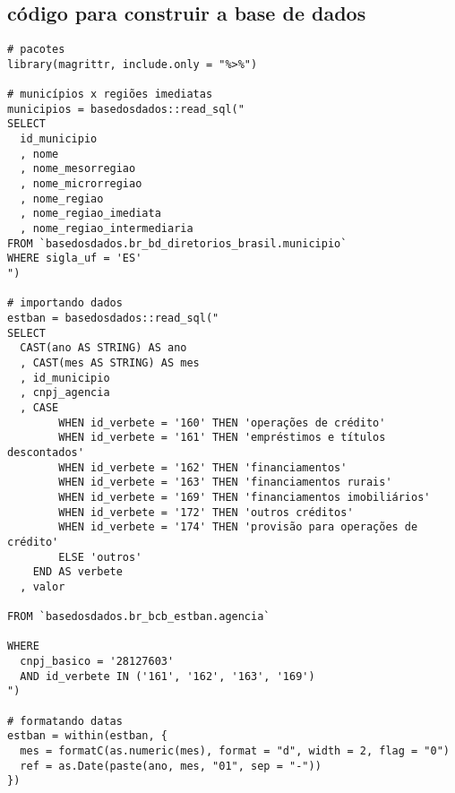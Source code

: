 \postextual

%
%
%
%
%

\begin{anexosenv}
\partanexos

\chapter{código para construir a base de dados}\label{anexo_a}

\begin{lstlisting}[frame=single]
# pacotes
library(magrittr, include.only = "%>%")

# municípios x regiões imediatas
municipios = basedosdados::read_sql("
SELECT
  id_municipio
  , nome
  , nome_mesorregiao
  , nome_microrregiao
  , nome_regiao
  , nome_regiao_imediata
  , nome_regiao_intermediaria
FROM `basedosdados.br_bd_diretorios_brasil.municipio`
WHERE sigla_uf = 'ES'
")

# importando dados
estban = basedosdados::read_sql("
SELECT
  CAST(ano AS STRING) AS ano
  , CAST(mes AS STRING) AS mes
  , id_municipio
  , cnpj_agencia
  , CASE
        WHEN id_verbete = '160' THEN 'operações de crédito'
        WHEN id_verbete = '161' THEN 'empréstimos e títulos descontados'
        WHEN id_verbete = '162' THEN 'financiamentos'
        WHEN id_verbete = '163' THEN 'financiamentos rurais'
        WHEN id_verbete = '169' THEN 'financiamentos imobiliários'
        WHEN id_verbete = '172' THEN 'outros créditos'
        WHEN id_verbete = '174' THEN 'provisão para operações de crédito'
        ELSE 'outros'
    END AS verbete
  , valor

FROM `basedosdados.br_bcb_estban.agencia`

WHERE
  cnpj_basico = '28127603'
  AND id_verbete IN ('161', '162', '163', '169')
")

# formatando datas
estban = within(estban, {
  mes = formatC(as.numeric(mes), format = "d", width = 2, flag = "0")
  ref = as.Date(paste(ano, mes, "01", sep = "-"))
})


\end{lstlisting}
\end{anexosenv}
